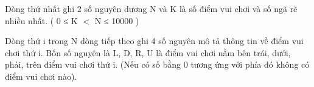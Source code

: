 Dòng thứ nhất ghi 2 số nguyên dương N và K là số điểm vui chơi và số ngã rẽ nhiều nhất. ( 0 ≤ K $<$ N ≤ 10000 )  

   Dòng thứ i trong N dòng tiếp theo ghi 4 số nguyên mô tả thông tin về điểm vui chơi thứ i. Bốn số nguyên là L, D, R, U là điểm vui chơi nằm bên trái, dưới, phải, trên điểm vui chơi thứ i. (Nếu có số bằng 0 tương ứng với phía đó không có điểm vui chơi nào).  

\